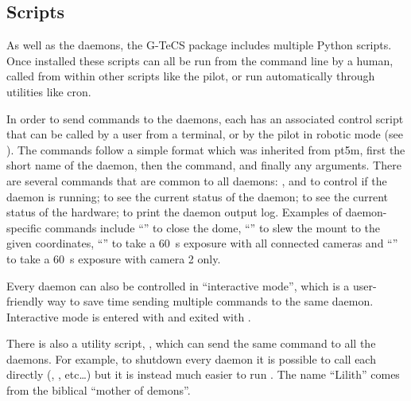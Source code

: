 \subsection{Scripts}
\label{sec:scripts}
\begin{colsection}

As well as the daemons, the G-TeCS package includes multiple Python scripts. Once installed these scripts can all be run from the command line by a human, called from within other scripts like the pilot, or run automatically through utilities like cron.

In order to send commands to the daemons, each has an associated control script that can be called by a user from a terminal, or by the pilot in robotic mode (see ). The commands follow a simple format which was inherited from pt5m, first the short name of the daemon, then the command, and finally any arguments. There are several commands that are common to all daemons: ,  and  to control if the daemon is running;  to see the current status of the daemon;  to see the current status of the hardware;  to print the daemon output log. Examples of daemon-specific commands include ``'' to close the dome, ``'' to slew the mount to the given coordinates, ``'' to take a \SI{60}{\second} exposure with all connected cameras and ``'' to take a \SI{60}{\second} exposure with camera 2 only.

Every daemon can also be controlled in ``interactive mode'', which is a user-friendly way to save time sending multiple commands to the same daemon. Interactive mode is entered with  and exited with .

There is also a utility script, , which can send the same command to all the daemons. For example, to shutdown every daemon it is possible to call each directly (, ,  etc\ldots) but it is instead much easier to run . The name ``Lilith'' comes from the biblical ``mother of demons''.


\end{colsection}
